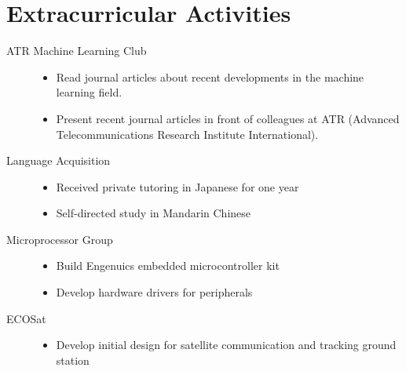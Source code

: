 \documentclass[a4paper, 10pt]{article}
\begin{document}
\section{Extracurricular Activities}
  \begin{description}
    \item[ATR Machine Learning Club] \hfill
      \begin{itemize}
        \item Read journal articles about recent developments in the machine learning field.
        \item Present recent journal articles in front of colleagues at ATR (Advanced Telecommunications Research Institute International).
      \end{itemize}
    \item[Language Acquisition] \hfill
      \begin{itemize}
        \item Received private tutoring in Japanese for one year
        \item Self-directed study in Mandarin Chinese
      \end{itemize}
    \item[Microprocessor Group] \hfill
      \begin{itemize}
        \item Build Engenuics embedded microcontroller kit
        \item Develop hardware drivers for peripherals
      \end{itemize}
    \item[ECOSat] \hfill
      \begin{itemize}
        \item Develop initial design for satellite communication and tracking ground station
      \end{itemize}
  \end{description}
\end{document}
